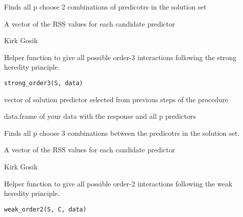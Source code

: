 \documentclass[letterpaper]{book}
\begin{document}
%
\begin{Details}\relax
Finds all p choose 2 combinations of predicotrs in the solution set
\end{Details}
%
\begin{Value}
A vector of the RSS values for each candidate predictor
\end{Value}
%
\begin{Author}\relax
Kirk Gosik
\end{Author}
%
\begin{SeeAlso}\relax
{}
\end{SeeAlso}
%
\begin{Description}\relax
Helper function to give all possible order-3 interactions following the strong
heredity principle.
\end{Description}
%
\begin{Usage}
\begin{verbatim}
strong_order3(S, data)
\end{verbatim}
\end{Usage}
%
\begin{Arguments}
\begin{ldescription}
\item[\code{S}] vector of solution predictor selected from previous steps of the procedure

\item[\code{data}] data.frame of your data with the response and all p predictors
\end{ldescription}
\end{Arguments}
%
\begin{Details}\relax
Finds all p choose 3 combinations between the predicotrs in the solution set.
\end{Details}
%
\begin{Value}
A vector of the RSS values for each candidate predictor
\end{Value}
%
\begin{Author}\relax
Kirk Gosik
\end{Author}
%
\begin{Description}\relax
Helper function to give all possible order-2 interactions following the weak
heredity principle.
\end{Description}
%
\begin{Usage}
\begin{verbatim}
weak_order2(S, C, data)
\end{verbatim}
\end{Usage}
\end{document}
